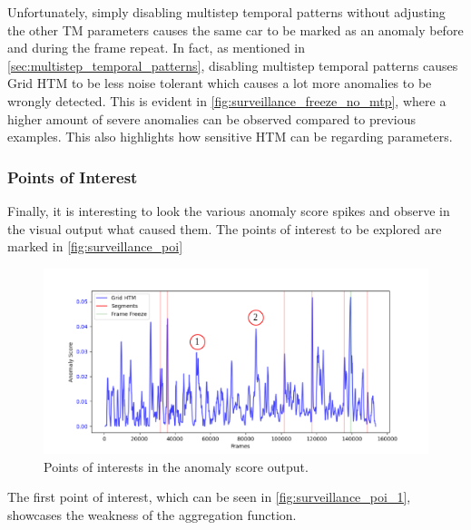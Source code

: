 Unfortunately, simply disabling multistep temporal patterns without adjusting the other TM parameters causes the same car to be marked as an anomaly before and during the frame repeat. In fact, as mentioned in \autoref{sec:multistep_temporal_patterns}, disabling multistep temporal patterns causes Grid HTM to be less noise tolerant which causes a lot more anomalies to be wrongly detected. This is evident in \autoref{fig:surveillance_freeze_no_mtp}, where a higher amount of severe anomalies can be observed compared to previous examples. This also highlights how sensitive HTM can be regarding parameters.
\subsubsection{Points of Interest}
Finally, it is interesting to look the various anomaly score spikes and observe in the visual output what caused them. The points of interest to be explored are marked in \autoref{fig:surveillance_poi}
\begin{figure}[H]
    \centering
    \includegraphics[width=\textwidth]{resources/experiments/surveillance/surveillance_result_poi.png}
    \caption{Points of interests in the anomaly score output.}
    \label{fig:surveillance_poi}
\end{figure}
The first point of interest, which can be seen in \autoref{fig:surveillance_poi_1}, showcases the weakness of the aggregation function.
